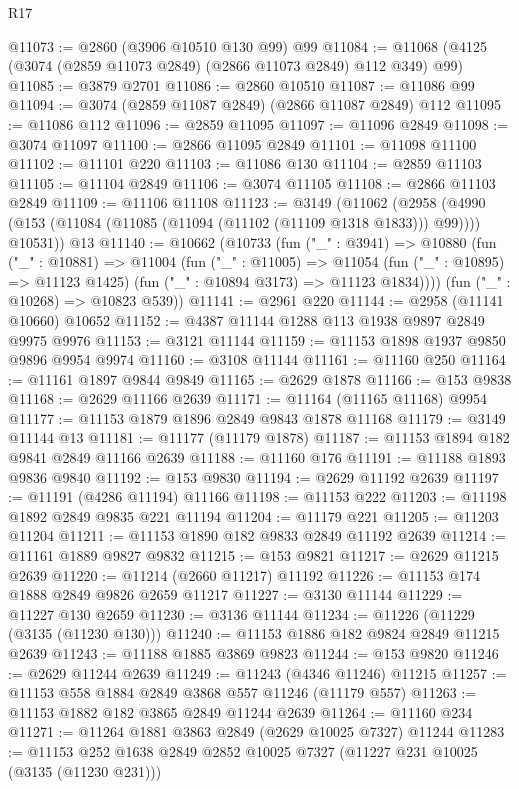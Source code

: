 \begin{lexlean}{R17}
\begin{coremodule}
@11073 := @2860 (@3906 @10510 @130 @99) @99
@11084 := @11068 (@4125 (@3074 (@2859 @11073 @2849) (@2866 @11073 @2849) @112 @349) @99)
@11085 := @3879 @2701
@11086 := @2860 @10510
@11087 := @11086 @99
@11094 := @3074 (@2859 @11087 @2849) (@2866 @11087 @2849) @112
@11095 := @11086 @112
@11096 := @2859 @11095
@11097 := @11096 @2849
@11098 := @3074 @11097
@11100 := @2866 @11095 @2849
@11101 := @11098 @11100
@11102 := @11101 @220
@11103 := @11086 @130
@11104 := @2859 @11103
@11105 := @11104 @2849
@11106 := @3074 @11105
@11108 := @2866 @11103 @2849
@11109 := @11106 @11108
@11123 := @3149
    (@11062
      (@2958 (@4990 (@153 (@11084 (@11085 (@11094 (@11102 (@11109 @1318 @1833))) @99)))) @10531))
    @13
@11140 := @10662
    (@10733
      (fun ("_" : @3941) =>
      @10880
        (fun ("_" : @10881) =>
        @11004
          (fun ("_" : @11005) =>
          @11054 (fun ("_" : @10895) => @11123 @1425) (fun ("_" : @10894 @3173) => @11123 @1834))))
      (fun ("_" : @10268) => @10823 @539))
@11141 := @2961 @220
@11144 := @2958 (@11141 @10660) @10652
@11152 := @4387 @11144 @1288 @113 @1938 @9897 @2849 @9975 @9976
@11153 := @3121 @11144
@11159 := @11153 @1898 @1937 @9850 @9896 @9954 @9974
@11160 := @3108 @11144
@11161 := @11160 @250
@11164 := @11161 @1897 @9844 @9849
@11165 := @2629 @1878
@11166 := @153 @9838
@11168 := @2629 @11166 @2639
@11171 := @11164 (@11165 @11168) @9954
@11177 := @11153 @1879 @1896 @2849 @9843 @1878 @11168
@11179 := @3149 @11144 @13
@11181 := @11177 (@11179 @1878)
@11187 := @11153 @1894 @182 @9841 @2849 @11166 @2639
@11188 := @11160 @176
@11191 := @11188 @1893 @9836 @9840
@11192 := @153 @9830
@11194 := @2629 @11192 @2639
@11197 := @11191 (@4286 @11194) @11166
@11198 := @11153 @222
@11203 := @11198 @1892 @2849 @9835 @221 @11194
@11204 := @11179 @221
@11205 := @11203 @11204
@11211 := @11153 @1890 @182 @9833 @2849 @11192 @2639
@11214 := @11161 @1889 @9827 @9832
@11215 := @153 @9821
@11217 := @2629 @11215 @2639
@11220 := @11214 (@2660 @11217) @11192
@11226 := @11153 @174 @1888 @2849 @9826 @2659 @11217
@11227 := @3130 @11144
@11229 := @11227 @130 @2659
@11230 := @3136 @11144
@11234 := @11226 (@11229 (@3135 (@11230 @130)))
@11240 := @11153 @1886 @182 @9824 @2849 @11215 @2639
@11243 := @11188 @1885 @3869 @9823
@11244 := @153 @9820
@11246 := @2629 @11244 @2639
@11249 := @11243 (@4346 @11246) @11215
@11257 := @11153 @558 @1884 @2849 @3868 @557 @11246 (@11179 @557)
@11263 := @11153 @1882 @182 @3865 @2849 @11244 @2639
@11264 := @11160 @234
@11271 := @11264 @1881 @3863 @2849 (@2629 @10025 @7327) @11244
@11283 := @11153 @252 @1638 @2849 @2852 @10025 @7327 (@11227 @231 @10025 (@3135 (@11230 @231)))

\end{coremodule}
\end{lexlean}
